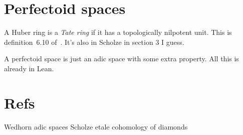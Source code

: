 \documentclass{amsart}
\theoremstyle{plain}
\theoremstyle{remark}
\begin{document}
\section{Perfectoid spaces}

A Huber ring is a \emph{Tate ring} if it has a topologically nilpotent unit. This is definition~6.10 of~\cite{wedhorn}. It's also in Scholze in section 3 I guess.


A perfectoid space is just an adic space with some extra property. All this is already in Lean.

\section{Refs}

Wedhorn adic spaces
Scholze etale cohomology of diamonds
\end{document}
